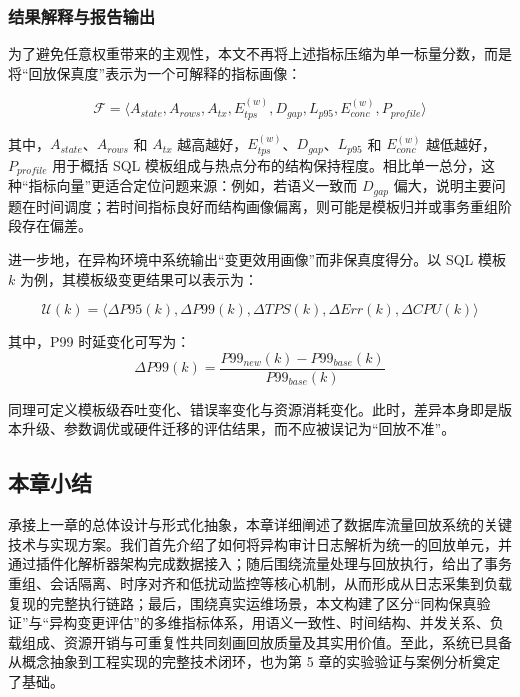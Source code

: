\subsubsection{结果解释与报告输出}
为了避免任意权重带来的主观性，本文不再将上述指标压缩为单一标量分数，而是将“回放保真度”表示为一个可解释的指标画像：

\begin{equation}
\mathcal{F} = \langle A_{state}, A_{rows}, A_{tx}, E_{tps}^{(w)}, D_{gap}, L_{p95}, E_{conc}^{(w)}, P_{profile} \rangle
\end{equation}

其中，$A_{state}$、$A_{rows}$ 和 $A_{tx}$ 越高越好，$E_{tps}^{(w)}$、$D_{gap}$、$L_{p95}$ 和 $E_{conc}^{(w)}$ 越低越好，$P_{profile}$ 用于概括 SQL 模板组成与热点分布的结构保持程度。相比单一总分，这种“指标向量”更适合定位问题来源：例如，若语义一致而 $D_{gap}$ 偏大，说明主要问题在时间调度；若时间指标良好而结构画像偏离，则可能是模板归并或事务重组阶段存在偏差。

进一步地，在异构环境中系统输出“变更效用画像”而非保真度得分。以 SQL 模板 $k$ 为例，其模板级变更结果可以表示为：

\begin{equation}
\mathcal{U}(k) = \langle \Delta P95(k), \Delta P99(k), \Delta TPS(k), \Delta Err(k), \Delta CPU(k) \rangle
\end{equation}

其中，P99 时延变化可写为：
\begin{equation}
\Delta P99(k) = \frac{P99_{new}(k)-P99_{base}(k)}{P99_{base}(k)}
\end{equation}

同理可定义模板级吞吐变化、错误率变化与资源消耗变化。此时，差异本身即是版本升级、参数调优或硬件迁移的评估结果，而不应被误记为“回放不准”。

\subsection{本章小结}
\label{sec:chapter_summary}
承接上一章的总体设计与形式化抽象，本章详细阐述了数据库流量回放系统的关键技术与实现方案。我们首先介绍了如何将异构审计日志解析为统一的回放单元，并通过插件化解析器架构完成数据接入；随后围绕流量处理与回放执行，给出了事务重组、会话隔离、时序对齐和低扰动监控等核心机制，从而形成从日志采集到负载复现的完整执行链路；最后，围绕真实运维场景，本文构建了区分“同构保真验证”与“异构变更评估”的多维指标体系，用语义一致性、时间结构、并发关系、负载组成、资源开销与可重复性共同刻画回放质量及其实用价值。至此，系统已具备从概念抽象到工程实现的完整技术闭环，也为第 5 章的实验验证与案例分析奠定了基础。
